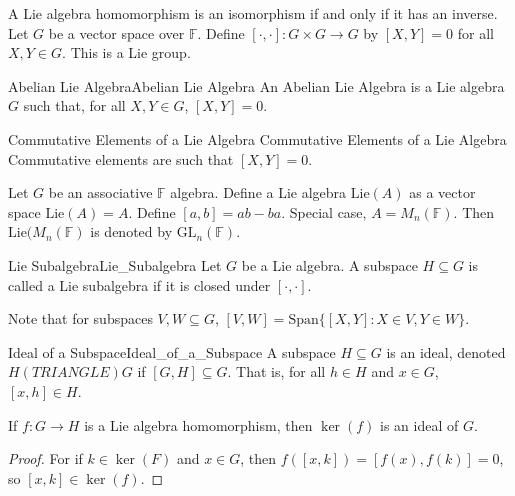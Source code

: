 \documentclass[crop=false,class=book,oneside]{standalone}                      %
\begin{document}
        \begin{lexample}{}{}
            A Lie algebra homomorphism is an isomorphism if and only if it has
            an inverse. Let $G$ be a vector space over $\mathbb{F}$. Define
            $[\cdot,\cdot]:G\times{G}\rightarrow{G}$ by $[X,Y]=0$ for all
            $X,Y\in{G}$. This is a Lie group.
        \end{lexample}
        \begin{ldefinition}{Abelian Lie Algebra}{Abelian Lie Algebra}
            An Abelian Lie Algebra is a Lie algebra $G$ such that, for all
            $X,Y\in{G}$, $[X,Y]=0$.
        \end{ldefinition}
        \begin{ldefinition}{Commutative Elements of a Lie Algebra}
                           {Commutative Elements of a Lie Algebra}
            Commutative elements are such that $[X,Y]=0$.
        \end{ldefinition}
        \begin{example}
            Let $G$ be an associative $\mathbb{F}$ algebra. Define a Lie
            algebra $\textrm{Lie}(A)$ as a vector space $\textrm{Lie}(A)=A$.
            Define $[a,b]=ab-ba$. Special case, $A=M_{n}(\mathbb{F})$.
            Then $\textrm{Lie}(M_{n}(\mathbb{F})$ is denoted by
            $\textrm{GL}_{n}(\mathbb{F})$.
        \end{example}
        \begin{ldefinition}{Lie Subalgebra}{Lie_Subalgebra}
            Let $G$ be a Lie algebra. A subspace $H\subseteq{G}$ is called a
            Lie subalgebra if it is closed under $[\cdot,\cdot]$.
        \end{ldefinition}
        Note that for subspaces $V,W\subseteq{G}$,
        $[V,W]=\textrm{Span}\{[X,Y]:X\in{V},Y\in{W}\}$.
        \begin{ldefinition}{Ideal of a Subspace}{Ideal_of_a_Subspace}
            A subspace $H\subseteq{G}$ is an ideal, denoted
            $H(TRIANGLE)G$ if $[G,H]\subseteq{G}$. That is, for all
            $h\in{H}$ and $x\in{G}$, $[x,h]\in{H}$.
        \end{ldefinition}
        \begin{theorem}
            If $f:G\rightarrow{H}$ is a Lie algebra homomorphism, then
            $\ker(f)$ is an ideal of $G$.
        \end{theorem}
        \begin{proof}
            For if $k\in\ker(F)$ and $x\in{G}$, then
            $f([x,k])=[f(x),f(k)]=0$, so $[x,k]\in\ker(f)$.
        \end{proof}
\end{document}
